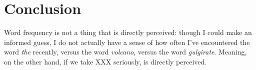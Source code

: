 \chapter{Conclusion}

Word frequency is not a thing that is directly perceived: though I could make an informed guess, I do not actually have a sense of how often I've encountered the word \emph{the} recently, versus the word \emph{volcano}, versus the word \emph{gulgirate}.  Meaning, on the other hand, if we take XXX seriously, is directly perceived.
